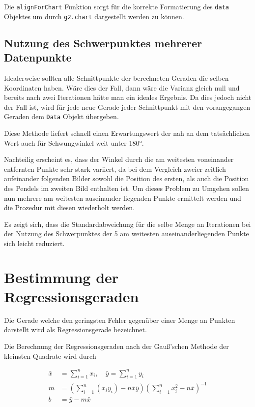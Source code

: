 Die \lstinline{alignForChart} Funktion sorgt für die korrekte Formatierung des \lstinline{data} Objektes um durch \lstinline{g2.chart} dargestellt werden zu können.

\subsection{Nutzung des Schwerpunktes mehrerer Datenpunkte}\label{ch:nutzung_des_schwerpunktes}

Idealerweise sollten alle Schnittpunkte der berechneten Geraden die selben Koordinaten haben.
Wäre dies der Fall, dann wäre die Varianz gleich null und bereits nach zwei Iterationen hätte man ein ideales Ergebnis.
Da dies jedoch nicht der Fall ist, wird für jede neue Gerade jeder Schnittpunkt mit den vorangegangen Geraden dem \lstinline{Data} Objekt übergeben.

Diese Methode liefert schnell einen Erwartungswert der nah an dem tatsächlichen Wert auch für Schwungwinkel weit unter 180°.

Nachteilig erscheint es, dass der Winkel durch die am weitesten voneinander entfernten Punkte sehr stark variiert, da bei dem Vergleich zweier zeitlich aufeinander folgenden Bilder sowohl die Position des ersten, als auch die Position des Pendels im zweiten Bild enthalten ist.
Um dieses Problem zu Umgehen sollen nun mehrere am weitesten auseinander liegenden Punkte ermittelt werden und die Prozedur mit diesen wiederholt werden.

Es zeigt sich, dass die Standardabweichung für die selbe Menge an Iterationen bei der Nutzung des Schwerpunktes der 5 am weitesten auseinanderliegenden Punkte sich leicht reduziert.


\section{Bestimmung der Regressionsgeraden}\label{ch:bestimmung_regressionsgerade}

Die Gerade welche den geringsten Fehler gegenüber einer Menge an Punkten darstellt wird als Regressionsgerade bezeichnet.

Die Berechnung der Regressionsgeraden nach der Gauß'schen Methode der kleinsten Quadrate wird durch %

\begin{equation}
    \begin{split}
        \bar{x} &= \sum_{i=1}^n x_i, \quad \bar{y} = \sum_{i=1}^n y_i \\
        m &= \left(\sum_{i=1}^n (x_i y_i) - n \bar{x} \bar{y}\right) \left(\sum_{i=1}^n x_i^2 - n \bar{x}\right)^{-1} \\
        b &= \bar{y} - m\bar{x}
    \end{split}
    \label{eq:regression_gauss}
\end{equation}

